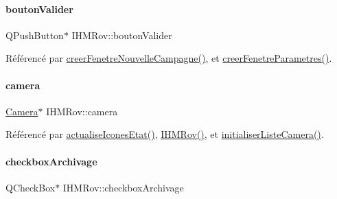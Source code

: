 \mbox{\label{class_i_h_m_rov_a4294b6c808089083906fb0815d1c9c27}} 
\paragraph{\texorpdfstring{bouton\+Valider}{boutonValider}}
{\footnotesize\ttfamily Q\+Push\+Button$\ast$ I\+H\+M\+Rov\+::bouton\+Valider\hspace{0.3cm}{\ttfamily [private]}}



Référencé par \hyperlink{class_i_h_m_rov_a08bf623a890df272f738c1ff8631213f}{creer\+Fenetre\+Nouvelle\+Campagne()}, et \hyperlink{class_i_h_m_rov_aed451139ac09ef18b7c92637761d80ce}{creer\+Fenetre\+Parametres()}.

\mbox{\label{class_i_h_m_rov_a0eda0e4726269508d4563d98064dca9d}} 
\paragraph{\texorpdfstring{camera}{camera}}
{\footnotesize\ttfamily \hyperlink{class_camera}{Camera}$\ast$ I\+H\+M\+Rov\+::camera\hspace{0.3cm}{\ttfamily [private]}}



Référencé par \hyperlink{class_i_h_m_rov_abbfcdc154a6ae7f941d186f6c90a5a2b}{actualise\+Icones\+Etat()}, \hyperlink{class_i_h_m_rov_a5dac1fb4612866cc61f699a415e0ef6b}{I\+H\+M\+Rov()}, et \hyperlink{class_i_h_m_rov_af3e46f174ab2fdeaebb2d00e6b8bcb33}{initialiser\+Liste\+Camera()}.

\mbox{\label{class_i_h_m_rov_a85be76b5fee7281642db582a79a53511}} 
\paragraph{\texorpdfstring{checkbox\+Archivage}{checkboxArchivage}}
{\footnotesize\ttfamily Q\+Check\+Box$\ast$ I\+H\+M\+Rov\+::checkbox\+Archivage\hspace{0.3cm}{\ttfamily [private]}}



